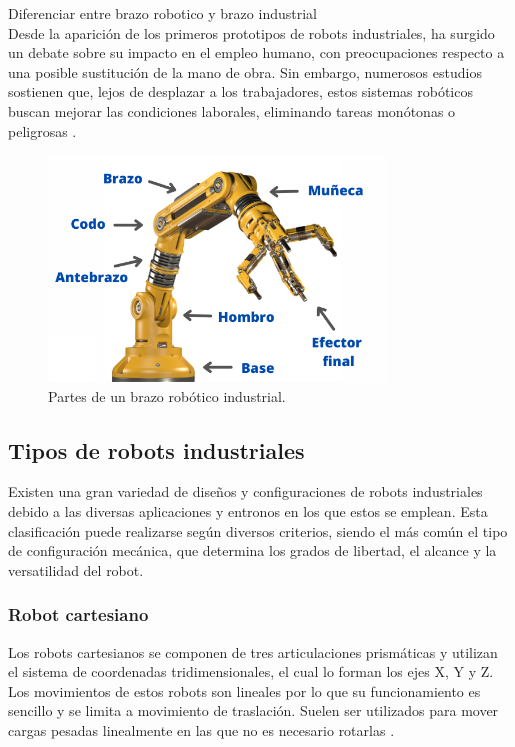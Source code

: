 Diferenciar entre brazo robotico y brazo industrial \\

Desde la aparición de los primeros prototipos de robots industriales, ha surgido un debate sobre su impacto en el empleo humano, con preocupaciones respecto a una posible sustitución de la mano de obra. Sin embargo, numerosos estudios sostienen que, lejos de desplazar a los trabajadores, estos sistemas robóticos buscan mejorar las condiciones laborales, eliminando tareas monótonas o peligrosas \cite{info_robotica_industrial_2}. 

\begin{figure} [h!]
  \begin{center}
    \includegraphics[width=9cm]{figs/brazo_industrial}
  \end{center}
  \caption{\centering Partes de un brazo robótico industrial.}
  \label{fig:brazo_industrials}
\end{figure}

\subsection{Tipos de robots industriales}
 
Existen una gran variedad de diseños y configuraciones de robots industriales debido a las diversas aplicaciones y entronos en los que estos se emplean. Esta clasificación puede realizarse según diversos criterios, siendo el más común el tipo de configuración mecánica, que determina los grados de libertad, el alcance y la versatilidad del robot.

\subsubsection{Robot cartesiano}

Los robots cartesianos se componen de tres articulaciones prismáticas y utilizan el sistema de coordenadas tridimensionales, el cual lo forman los ejes X, Y y Z. Los movimientos de estos robots son lineales por lo que su funcionamiento es sencillo y se limita a movimiento de traslación. Suelen ser utilizados para mover cargas pesadas linealmente en las que no es necesario rotarlas \cite{tipos_robots_1}. 

